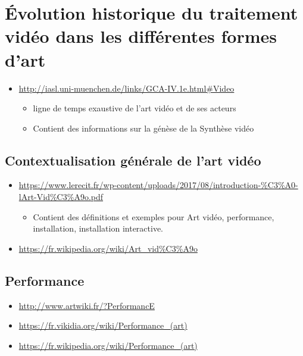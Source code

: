 \documentclass[
]{book}
\providecommand{\tightlist}{%
  \setlength{\itemsep}{0pt}\setlength{\parskip}{0pt}}
\begin{document}
\hypertarget{evolution_historique}{%
\section{Évolution historique du traitement vidéo dans les différentes formes d'art}\label{evolution_historique}}

\begin{itemize}
\tightlist
\item
  \url{http://iasl.uni-muenchen.de/links/GCA-IV.1e.html\#Video}

  \begin{itemize}
  \tightlist
  \item
    ligne de temps exaustive de l'art vidéo et de ses acteurs
  \item
    Contient des informations sur la génèse de la Synthèse vidéo
  \end{itemize}
\end{itemize}

\hypertarget{contextualisation-guxe9nuxe9rale-de-lart-viduxe9o}{%
\subsection{Contextualisation générale de l'art vidéo}\label{contextualisation-guxe9nuxe9rale-de-lart-viduxe9o}}

\begin{itemize}
\tightlist
\item
  \url{https://www.lerecit.fr/wp-content/uploads/2017/08/introduction-\%C3\%A0-lArt-Vid\%C3\%A9o.pdf}

  \begin{itemize}
  \tightlist
  \item
    Contient des définitions et exemples pour Art vidéo, performance, installation, installation interactive.
  \end{itemize}
\item
  \url{https://fr.wikipedia.org/wiki/Art_vid\%C3\%A9o}
\end{itemize}

\hypertarget{evolution_historique_performance}{%
\subsection{Performance}\label{evolution_historique_performance}}

\begin{itemize}
\tightlist
\item
  \url{http://www.artwiki.fr/?PerformancE}
\item
  \url{https://fr.vikidia.org/wiki/Performance_(art)}
\item
  \url{https://fr.wikipedia.org/wiki/Performance_(art)}
\end{itemize}
\end{document}
